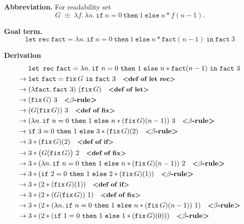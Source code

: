 \documentclass{article}
\theoremstyle{theorem}
\theoremstyle{definition}
\theoremstyle{remark}
\begin{document}
\textbf{Abbreviation.}  
For readability set
\[
G \;\equiv\; \lambda f.\,\lambda n.\, \texttt{if}\ n=0\ \texttt{then}\ 1\ \texttt{else}\ n * f(n-1).
\]

\textbf{Goal term.}
\[
\texttt{let rec}\ \texttt{fact} = \lambda n.\, \texttt{if}\ n=0\ \texttt{then}\ 1\ \texttt{else}\ n * \texttt{fact}(n-1)\ \texttt{in}\ \texttt{fact}\ 3
\]

\textbf{Derivation}
\[
\begin{aligned}
&\texttt{let rec}\ \texttt{fact} = \lambda n.\,\texttt{if}\ n=0\ \texttt{then}\ 1\ \texttt{else}\ n * \texttt{fact}(n-1)\ \texttt{in}\ \texttt{fact}\ 3
\\
\to\;& \texttt{let}\ \texttt{fact} = \texttt{fix}\,G\ \texttt{in}\ \texttt{fact}\ 3 \quad \textbf{\small<def of let rec>}
\\
\to\;& (\lambda \texttt{fact}.\, \texttt{fact}\ 3)\ (\texttt{fix}\,G) \quad \textbf{\small<def of let>}
\\
\to\;& (\texttt{fix}\,G)\ 3 \quad \textbf{\small<}\beta\textbf{-rule>}
\\
\to\;& (G(\texttt{fix}\,G))\ 3 \quad \textbf{\small<def of fix>}
\\
\to\;& (\lambda n.\, \texttt{if}\ n=0\ \texttt{then}\ 1\ \texttt{else}\ n*(\texttt{fix}\,G)(n-1))\ 3 \quad \textbf{\small<}\beta\textbf{-rule>}
\\
\to\;& \texttt{if}\ 3=0\ \texttt{then}\ 1\ \texttt{else}\ 3 * (\texttt{fix}\,G)(2) \quad \textbf{\small<}\beta\textbf{-rule>}
\\
\to\;& 3 * (\texttt{fix}\,G)(2) \quad \textbf{\small<def of if>}
\\
\to\;& 3 * \big(G(\texttt{fix}\,G)\big)\ 2 \quad \textbf{\small<def of fix>}
\\
\to\;& 3 * (\lambda n.\,\texttt{if}\ n=0\ \texttt{then}\ 1\ \texttt{else}\ n*(\texttt{fix}\,G)(n-1))\ 2 \quad \textbf{\small<}\beta\textbf{-rule>}
\\
\to\;& 3 * (\texttt{if}\ 2=0\ \texttt{then}\ 1\ \texttt{else}\ 2*(\texttt{fix}\,G)(1)) \quad \textbf{\small<}\beta\textbf{-rule>}
\\
\to\;& 3 * (2 * (\texttt{fix}\,G)(1)) \quad \textbf{\small<def of if>}
\\
\to\;& 3 * (2 * (G(\texttt{fix}\,G))\ 1) \quad \textbf{\small<def of fix>}
\\
\to\;& 3 * (2 * (\lambda n.\,\texttt{if}\ n=0\ \texttt{then}\ 1\ \texttt{else}\ n*(\texttt{fix}\,G)(n-1))\ 1) \quad \textbf{\small<}\beta\textbf{-rule>}
\\
\to\;& 3 * (2 * (\texttt{if}\ 1=0\ \texttt{then}\ 1\ \texttt{else}\ 1*(\texttt{fix}\,G)(0))) \quad \textbf{\small<}\beta\textbf{-rule>}

\end{aligned}\]
\end{document}
